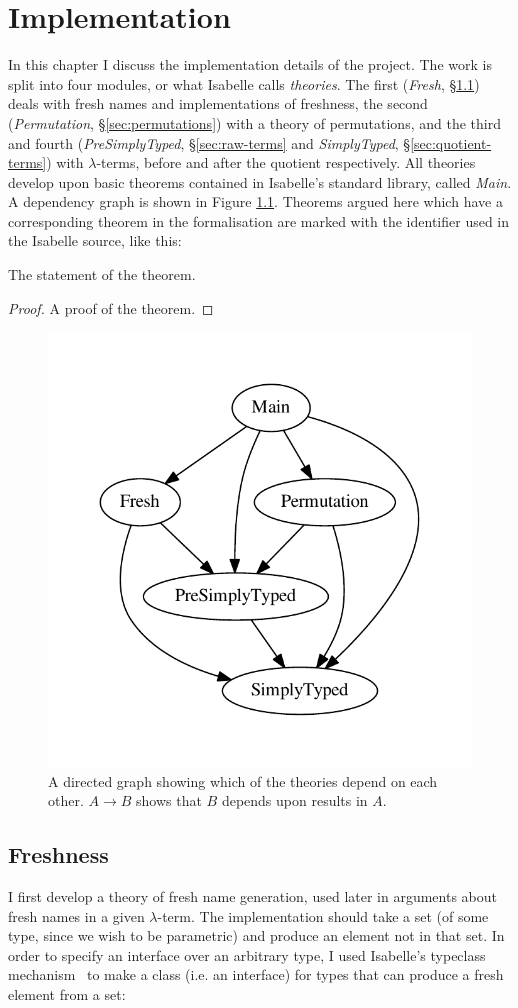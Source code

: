 \chapter{Implementation}
In this chapter I discuss the implementation details of the project.
The work is split into four modules, or what Isabelle calls \emph{theories}.
The first (\emph{Fresh}, \S\ref{sec:freshness}) deals with fresh names and implementations of freshness, the second (\emph{Permutation}, \S\ref{sec:permutations}) with a theory of permutations, and the third and fourth (\emph{PreSimplyTyped}, \S\ref{sec:raw-terms} and \emph{SimplyTyped}, \S\ref{sec:quotient-terms}) with \(\lambda\)-terms, before and after the quotient respectively.
All theories develop upon basic theorems contained in Isabelle's standard library, called \emph{Main}.
A dependency graph is shown in Figure \ref{fig:dependencies}.
Theorems argued here which have a corresponding theorem in the formalisation are marked with the identifier used in the Isabelle source, like this:
\setcounter{theorem}{-1}
\begin{theorem}
The statement of the theorem.
\end{theorem}
\begin{proof}
A proof of the theorem.
\end{proof}

\begin{figure}
\centering
\includegraphics[width=.5\textwidth]{chapters/implementation/figures/dependencies}
\caption{A directed graph showing which of the theories depend on each other. \(A \to B\) shows that \(B\) depends upon results in \(A\).}
\label{fig:dependencies}
\end{figure}

\section{Freshness}
\label{sec:freshness}
I first develop a theory of fresh name generation, used later in arguments about fresh names in a given \(\lambda\)-term.
The implementation should take a set (of some type, since we wish to be parametric) and produce an element not in that set.
In order to specify an interface over an arbitrary type, I used Isabelle's typeclass mechanism~\cite{isabelle-typeclasses} to make a class (i.e. an interface) for types that can produce a fresh element from a set:

